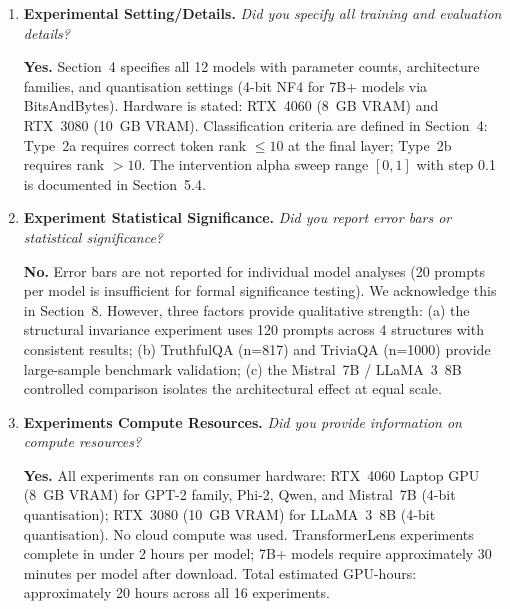 \documentclass{article}
\begin{document}
{\begin{enumerate}[leftmargin=*,label=\arabic*.,itemsep=8pt]
\textbf{Yes.}
Code: \texttt{[anonymised]}\\
Library: \texttt{[anonymised]}\\
Dataset: \texttt{[anonymised]}\\
All experiment scripts, the \textsc{HallScope} library, and the
\textsc{HallBench~v2} dataset will be released upon acceptance.
An anonymised version of the code and data is included in the
supplementary material submitted with this paper.

\item \textbf{Experimental Setting/Details.}
\textit{Did you specify all training and evaluation details?}

\textbf{Yes.}
Section~4 specifies all 12 models with parameter counts, architecture
families, and quantisation settings (4-bit NF4 for 7B+ models via
BitsAndBytes).
Hardware is stated: RTX~4060 (8~GB VRAM) and RTX~3080 (10~GB VRAM).
Classification criteria are defined in Section~4: Type~2a requires
correct token rank $\leq10$ at the final layer; Type~2b requires rank
$>10$.
The intervention alpha sweep range $[0,1]$ with step 0.1 is documented
in Section~5.4.

\item \textbf{Experiment Statistical Significance.}
\textit{Did you report error bars or statistical significance?}

\textbf{No.}
Error bars are not reported for individual model analyses (20 prompts per
model is insufficient for formal significance testing).
We acknowledge this in Section~8.
However, three factors provide qualitative strength:
(a) the structural invariance experiment uses 120 prompts across 4
structures with consistent results;
(b) TruthfulQA (n=817) and TriviaQA (n=1000) provide large-sample
benchmark validation;
(c) the Mistral~7B / LLaMA~3~8B controlled comparison isolates the
architectural effect at equal scale.

\item \textbf{Experiments Compute Resources.}
\textit{Did you provide information on compute resources?}

\textbf{Yes.}
All experiments ran on consumer hardware: RTX~4060 Laptop GPU (8~GB VRAM)
for GPT-2 family, Phi-2, Qwen, and Mistral~7B (4-bit quantisation);
RTX~3080 (10~GB VRAM) for LLaMA~3~8B (4-bit quantisation).
No cloud compute was used.
TransformerLens experiments complete in under 2 hours per model;
7B+ models require approximately 30 minutes per model after download.
Total estimated GPU-hours: approximately 20 hours across all 16 experiments.


\end{enumerate}}
\end{document}
